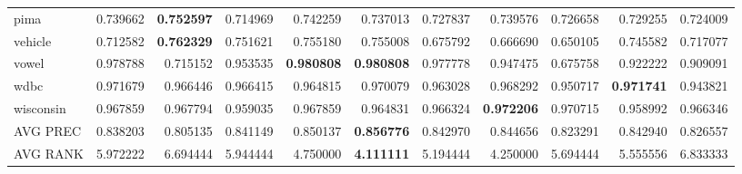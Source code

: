 \begin{tabular}{lrrrrrrrrrr}
pima            &   0.739662 &  \textbf{0.752597} &  0.714969 &  0.742259 &  0.737013 &  0.727837 &  0.739576 &  0.726658 &  0.729255 &  0.724009 \\
vehicle         &   0.712582 &  \textbf{0.762329} &  0.751621 &  0.755180 &  0.755008 &  0.675792 &  0.666690 &  0.650105 &  0.745582 &  0.717077 \\
vowel           &   0.978788 &  0.715152 &  0.953535 &  \textbf{0.980808} &  \textbf{0.980808} &  0.977778 &  0.947475 &  0.675758 &  0.922222 &  0.909091 \\
wdbc            &   0.971679 &  0.966446 &  0.966415 &  0.964815 &  0.970079 &  0.963028 &  0.968292 &  0.950717 &  \textbf{0.971741} &  0.943821 \\
wisconsin       &   0.967859 &  0.967794 &  0.959035 &  0.967859 &  0.964831 &  0.966324 &  \textbf{0.972206} &  0.970715 &  0.958992 &  0.966346 \\
\bottomrule
AVG PREC & 0.838203 & 0.805135 & 0.841149 & 0.850137 & \textbf{0.856776} & 0.842970 & 0.844656 & 0.823291 & 0.842940 & 0.826557 \\
AVG RANK & 5.972222 & 6.694444 & 5.944444 & 4.750000 & \textbf{4.111111} & 5.194444 & 4.250000 & 5.694444 & 5.555556 & 6.833333 \\ 
\end{tabular}
